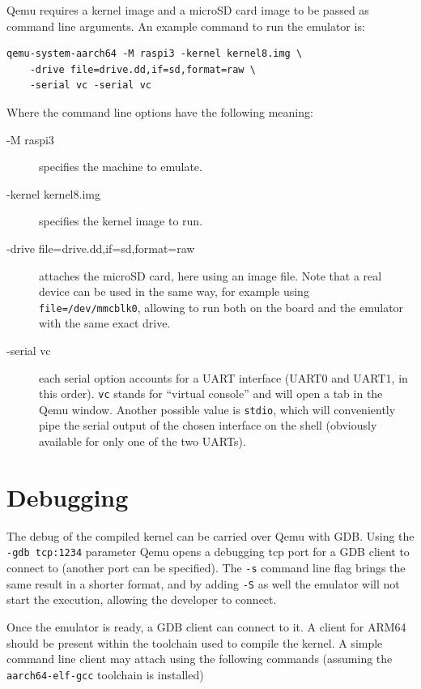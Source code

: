 \documentclass[12pt,a4paper,openright,twoside]{report}
\begin{document}


Qemu requires a kernel image and a microSD card image to be passed as command
line arguments. An example command to run the emulator is:
\begin{lstlisting}
qemu-system-aarch64 -M raspi3 -kernel kernel8.img \
    -drive file=drive.dd,if=sd,format=raw \
    -serial vc -serial vc
\end{lstlisting}

Where the command line options have the following meaning:
\begin{description}
    \item[-M raspi3] specifies the machine to emulate.
    \item[-kernel kernel8.img] specifies the kernel image to run.
    \item[-drive file=drive.dd,if=sd,format=raw] attaches the microSD card, here
        using an image file. Note that a real device can be used in the same way,
        for example using {\tt file=/dev/mmcblk0}, allowing to run both on the
        board and the emulator with the same exact drive.
    \item[-serial vc] each serial option accounts for a UART interface (UART0 and UART1,
        in this order). {\tt vc} stands for ``virtual console'' and will open a 
        tab in the Qemu window. Another possible value is {\tt stdio}, which will
        conveniently pipe the serial output of the chosen interface on the shell
        (obviously available for only one of the two UARTs).
\end{description}

\section{Debugging}
The debug of the compiled kernel can be carried over Qemu with GDB. Using the
{\tt -gdb tcp:1234} parameter Qemu opens a debugging tcp port for a GDB client
to connect to (another port can be specified). The {\tt -s} command line flag 
brings the same result in a shorter format, and by adding {\tt -S} as well the
emulator will not start the execution, allowing the developer to connect.

Once the emulator is ready, a GDB client can connect to it. A client for
ARM64 should be present within the toolchain used to compile the kernel.
 A simple command line client may attach using the following commands (assuming
 the {\tt aarch64-elf-gcc} toolchain is installed)
\end{document}

